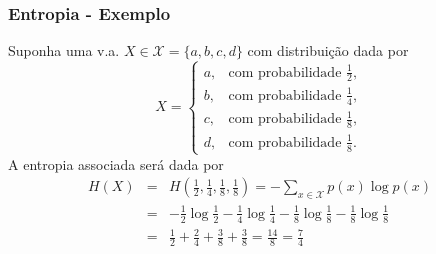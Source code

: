 \begin{frame}%
    \frametitle{Entropia - Exemplo}
  Suponha uma v.a. $X \in \mathcal{X} = \{a,b,c,d\}$ com distribuição dada por  
  \begin{equation}
  X = \begin{cases} a, & \text{com probabilidade } \frac{1}{2}, \\
                b, & \text{com probabilidade } \frac{1}{4}, \\
                c, & \text{com probabilidade } \frac{1}{8}, \\
                d, & \text{com probabilidade } \frac{1}{8}.
      \end{cases}
  \end{equation}
  A entropia associada será dada por
  \begin{eqnarray}
   H(X) &=& H\left(\frac{1}{2},\frac{1}{4},\frac{1}{8},\frac{1}{8}\right) = - \sum_{x \in \mathcal{X}} p(x) \log p(x) \nonumber \\
        &=& -\frac{1}{2} \log \frac{1}{2} - \frac{1}{4} \log \frac{1}{4} - \frac{1}{8} \log \frac{1}{8} - \frac{1}{8} \log \frac{1}{8} \nonumber \\
        &=& \frac{1}{2} + \frac{2}{4} + \frac{3}{8} + \frac{3}{8} = \frac{14}{8} = \frac{7}{4} 
  \end{eqnarray}
\end{frame}
